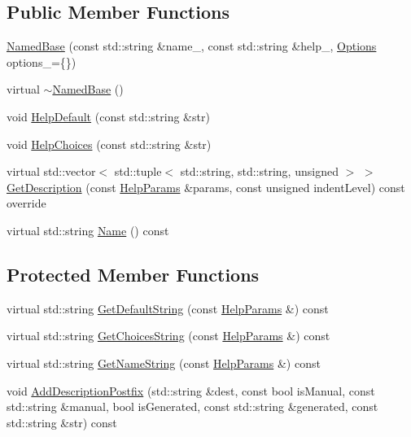 \subsection*{Public Member Functions}
\begin{DoxyCompactItemize}
\item 
\hyperlink{classargs_1_1_named_base_a09810fc700d6ab589e04f3414edb4f4f}{Named\+Base} (const std\+::string \&name\+\_\+, const std\+::string \&help\+\_\+, \hyperlink{namespaceargs_aa530c0f95194aa275f49a5f299ac9e77}{Options} options\+\_\+=\{\})
\item 
virtual \hyperlink{classargs_1_1_named_base_af4a12e876c93437cd73633bb8255e8eb}{$\sim$\+Named\+Base} ()
\item 
void \hyperlink{classargs_1_1_named_base_a1e94ca498932f60c6e98ba4b88abcc4b}{Help\+Default} (const std\+::string \&str)
\item 
void \hyperlink{classargs_1_1_named_base_a084a776592a24153f1f0aaf28d81f495}{Help\+Choices} (const std\+::string \&str)
\item 
virtual std\+::vector$<$ std\+::tuple$<$ std\+::string, std\+::string, unsigned $>$ $>$ \hyperlink{classargs_1_1_named_base_ab0b9e1f22abf04b24659fada61a6d665}{Get\+Description} (const \hyperlink{structargs_1_1_help_params}{Help\+Params} \&params, const unsigned indent\+Level) const override
\item 
virtual std\+::string \hyperlink{classargs_1_1_named_base_a7e7bab5c0de59e717b87935b14376dfc}{Name} () const
\end{DoxyCompactItemize}
\subsection*{Protected Member Functions}
\begin{DoxyCompactItemize}
\item 
virtual std\+::string \hyperlink{classargs_1_1_named_base_a5866b205907d924423eb8aac9a9e65f8}{Get\+Default\+String} (const \hyperlink{structargs_1_1_help_params}{Help\+Params} \&) const
\item 
virtual std\+::string \hyperlink{classargs_1_1_named_base_aa9104a04001d10c5732a5feb01204cf7}{Get\+Choices\+String} (const \hyperlink{structargs_1_1_help_params}{Help\+Params} \&) const
\item 
virtual std\+::string \hyperlink{classargs_1_1_named_base_a3c597a489d3ccc74937682407c08b3f7}{Get\+Name\+String} (const \hyperlink{structargs_1_1_help_params}{Help\+Params} \&) const
\item 
void \hyperlink{classargs_1_1_named_base_acfaa8c03922fc9b0181a10ca03156e12}{Add\+Description\+Postfix} (std\+::string \&dest, const bool is\+Manual, const std\+::string \&manual, bool is\+Generated, const std\+::string \&generated, const std\+::string \&str) const
\end{DoxyCompactItemize}

